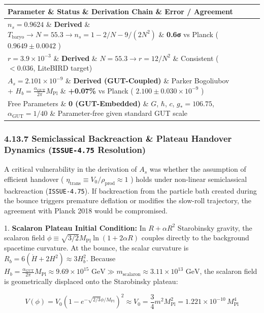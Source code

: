 \documentclass[11pt,a4paper]{article}
\theoremstyle{definition}\newtheorem{definition}{Definition}
\theoremstyle{remark}\newtheorem{remark}{Remark}
\begin{document}
\begin{longtable}{llll}
\hline
Parameter \& Status \& Derivation Chain \& Error / Agreement \\
\hline
$n_s = 0.9624$ \& \textbf{Derived} \& $T_{\text{baryo}} \to N = 55.3 \to n_s = 1 - 2/N - 9/(2N^2)$ \& \textbf{0.6σ} vs Planck ( $0.9649 \pm 0.0042$ ) \\
$r = 3.9 \times 10^{-3}$ \& \textbf{Derived} \& $N = 55.3 \to r = 12/N^2$ \& Consistent ( $< 0.036$, LiteBIRD target) \\
$A_s = 2.101 \times 10^{-9}$ \& \textbf{Derived (GUT-Coupled)} \& Parker Bogoliubov + $H_b = \frac{\alpha_{\text{GUT}}}{2\pi} M_{\text{Pl}}$ \& \textbf{+0.07\%} vs Planck ( $2.100 \pm 0.030 \times 10^{-9}$ ) \\
Free Parameters \& \textbf{0 (GUT-Embedded)} \& $G$, $\hbar$, $c$, $g_* = 106.75$, $\alpha_{\text{GUT}} = 1/40$ \& Parameter-free given standard GUT scale \\
\hline
\end{longtable}\subsubsection{4.13.7 Semiclassical Backreaction \& Plateau Handover Dynamics (\texttt{ISSUE-4.75} Resolution)}

A critical vulnerability in the derivation of $A_s$ was whether the assumption of efficient handover ( $\eta_{\text{trans}} \equiv V_0 / \rho_{\text{prod}} \approx 1$ ) holds under non-linear semiclassical backreaction (\texttt{ISSUE-4.75}). If backreaction from the particle bath created during the bounce triggers premature deflation or modifies the slow-roll trajectory, the agreement with Planck 2018 would be compromised.

1. \textbf{Scalaron Plateau Initial Condition:}
In $R + \alpha R^2$ Starobinsky gravity, the scalaron field $\phi \equiv \sqrt{3/2} M_{\text{Pl}} \ln(1 + 2\alpha R)$ couples directly to the background spacetime curvature. At the bounce, the scalar curvature is $R_b = 6(\dot{H} + 2H^2) \approx 3 H_b^2$. Because $H_b = \frac{\alpha_{\text{GUT}}}{2\pi} M_{\text{Pl}} \approx 9.69 \times 10^{15}\text{ GeV} \gg m_{\text{scalaron}} \approx 3.11 \times 10^{13}\text{ GeV}$, the scalaron field is geometrically displaced onto the Starobinsky plateau:


\begin{equation}
V(\phi) = V_0 \left(1 - e^{-\sqrt{2/3}\phi/M_{\text{Pl}}}\right)^2 \approx V_0 = \frac{3}{4} m^2 M_{\text{Pl}}^2 = 1.221 \times 10^{-10} \, M_{\text{Pl}}^4
\end{equation}
\end{document}
